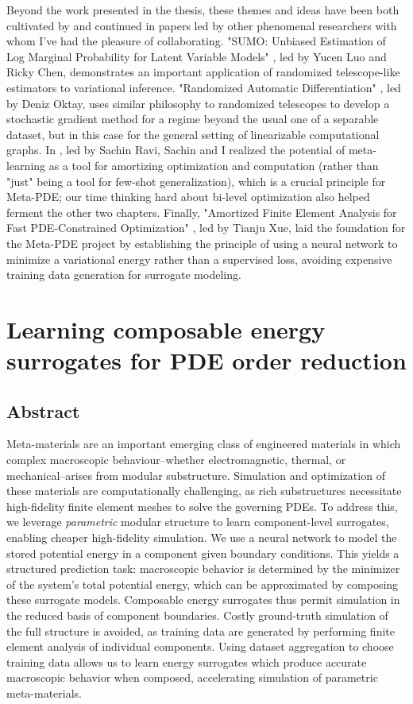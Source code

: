 \documentclass{puthesis}
\begin{document}
Beyond the work presented in the thesis, these themes and ideas have been
both cultivated by and continued in papers led by
other phenomenal researchers with whom I've had the pleasure of collaborating.
"SUMO: Unbiased Estimation of Log Marginal Probability for Latent
Variable Models" \citep{luo2019sumo},
led by Yucen Luo and Ricky Chen, demonstrates
an important application of randomized telescope-like estimators to
variational inference.
"Randomized Automatic Differentiation" \citep{oktay2021randomized},
led by Deniz Oktay, uses similar philosophy to
randomized telescopes to develop a stochastic gradient method for a
regime beyond the usual one of a separable dataset,
but in this case for the general setting of linearizable computational graphs.
In \citep{ravi2018amortized},
led by Sachin Ravi, Sachin and I
realized the potential of meta-learning as a tool for amortizing
optimization and computation (rather than "just" being a tool for
few-shot generalization), which is a crucial principle for Meta-PDE;
our time thinking hard about bi-level optimization also
helped ferment the other two chapters.
Finally,
"Amortized Finite Element Analysis for Fast PDE-Constrained Optimization"
\citep{xue2020amortized},
led by Tianju Xue, laid the foundation for the Meta-PDE
project by establishing the principle of using a neural network to
minimize a variational energy rather than a supervised loss,
avoiding expensive training data generation for surrogate modeling.


\chapter{Learning composable energy surrogates for PDE order reduction}

\section{Abstract}
Meta-materials are an important emerging class of engineered materials in which complex macroscopic behaviour--whether electromagnetic, thermal, or mechanical--arises from modular substructure.
Simulation and optimization of these materials are computationally challenging, as rich substructures necessitate high-fidelity finite element meshes to solve the governing PDEs.
To address this, we leverage \emph{parametric} modular structure to learn component-level surrogates, enabling cheaper high-fidelity simulation.
We use a neural network to model the stored potential energy in a component given boundary conditions. This yields a structured prediction task: macroscopic behavior is determined by the minimizer of the system's total potential energy, which can be approximated by composing these surrogate models. Composable energy surrogates thus permit simulation in the reduced basis of component boundaries. Costly ground-truth simulation of the full structure is avoided, as
training data are generated by performing finite element analysis of individual components. Using dataset aggregation to choose training data allows us to learn energy surrogates which produce accurate macroscopic behavior when composed, accelerating simulation of parametric meta-materials.
\end{document}
